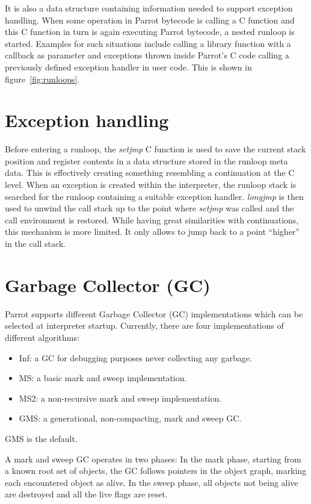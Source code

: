 \documentclass[bachelor,english]{hgbthesis}
\begin{document}
It is also a data structure containing information needed to support exception handling. When some operation in Parrot bytecode is calling a C function and this C function in turn is again executing Parrot bytecode, a nested runloop is started. Examples for such situations include calling a library function with a callback as parameter and exceptions thrown inside Parrot's C code calling a previously defined exception handler in user code. This is shown in figure~\ref{fig:runloops}.

\section{Exception handling}

Before entering a runloop, the \textit{setjmp} C function is used to save the current stack position and register contents in a data structure stored in the runloop meta data. This is effectively creating something resembling a continuation at the C level. When an exception is created within the interpreter, the runloop stack is searched for the runloop containing a suitable exception handler. \textit{longjmp} is then used to unwind the call stack up to the point where \textit{setjmp} was called and the call environment is restored. While having great similarities with continuations, this mechanism is more limited. It only allows to jump back to a point ``higher'' in the call stack.

\section{Garbage Collector (GC)}

Parrot supports different Garbage Collector (GC) implementations which can be selected at interpreter startup. Currently, there are four implementations of different algorithms:
\begin{itemize}
\item Inf: a GC for debugging purposes never collecting any garbage.
\item MS: a basic mark and sweep implementation.
\item MS2: a non-recursive mark and sweep implementation.
\item GMS: a generational, non-compacting, mark and sweep GC.
\end{itemize}
GMS is the default.

A mark and sweep GC operates in two phases: In the mark phase, starting from a known root set of objects, the GC follows pointers in the object graph, marking each encountered object as alive. In the sweep phase, all objects not being alive are destroyed and all the live flags are reset.
\end{document}
